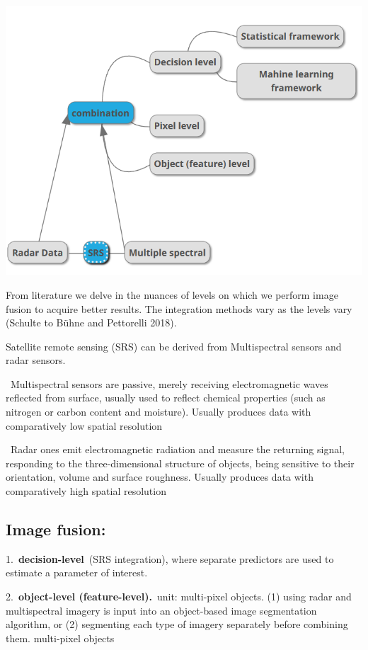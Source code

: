 \documentclass[
  letterpaper,
  DIV=11,
  numbers=noendperiod]{scrreprt}
\begin{document}
\includegraphics{./images/image-620878088.png}

From literature we delve in the nuances of levels on which we perform
image fusion to acquire better results. The integration methods vary as
the levels vary (Schulte to Bühne and Pettorelli 2018).

Satellite remote sensing (SRS) can be derived from Multispectral sensors
and radar sensors.~

~Multispectral sensors are passive, merely receiving electromagnetic
waves reflected from surface, usually used to reflect chemical
properties (such as nitrogen or carbon content and moisture). Usually
produces data with comparatively low spatial resolution

~Radar ones emit electromagnetic radiation and measure the returning
signal, responding to the three-dimensional structure of objects, being
sensitive to their orientation, volume and surface roughness. Usually
produces data with comparatively high spatial resolution

\hypertarget{image-fusion}{%
\subsection{Image fusion:}\label{image-fusion}}

1.~\textbf{decision-level}~(SRS integration), where separate predictors
are used to estimate a parameter of interest.~

2.~\textbf{object-level (feature-level).}~unit: multi-pixel objects. (1)
using radar and multispectral imagery is input into an object-based
image segmentation algorithm, or (2) segmenting each type of imagery
separately before combining them. multi-pixel objects
\end{document}
